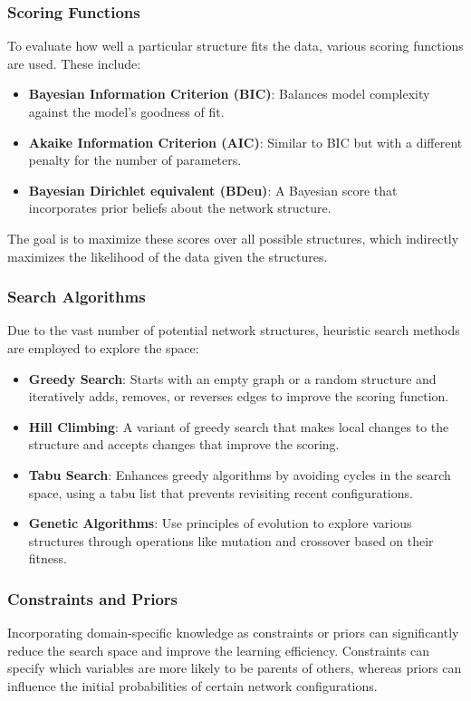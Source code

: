 \subsubsection{Scoring Functions}
To evaluate how well a particular structure fits the data, various scoring functions are used. These include:
\begin{itemize}
    \item \textbf{Bayesian Information Criterion (BIC)}: Balances model complexity against the model's goodness of fit.
    \item \textbf{Akaike Information Criterion (AIC)}: Similar to BIC but with a different penalty for the number of parameters.
    \item \textbf{Bayesian Dirichlet equivalent (BDeu)}: A Bayesian score that incorporates prior beliefs about the network structure.
\end{itemize}
The goal is to maximize these scores over all possible structures, which indirectly maximizes the likelihood of the data given the structures.

\subsubsection{Search Algorithms}
Due to the vast number of potential network structures, heuristic search methods are employed to explore the space:
\begin{itemize}
    \item \textbf{Greedy Search}: Starts with an empty graph or a random structure and iteratively adds, removes, or reverses edges to improve the scoring function.
    \item \textbf{Hill Climbing}: A variant of greedy search that makes local changes to the structure and accepts changes that improve the scoring.
    \item \textbf{Tabu Search}: Enhances greedy algorithms by avoiding cycles in the search space, using a tabu list that prevents revisiting recent configurations.
    \item \textbf{Genetic Algorithms}: Use principles of evolution to explore various structures through operations like mutation and crossover based on their fitness.
\end{itemize}

\subsubsection{Constraints and Priors}
Incorporating domain-specific knowledge as constraints or priors can significantly reduce the search space and improve the learning efficiency. Constraints can specify which variables are more likely to be parents of others, whereas priors can influence the initial probabilities of certain network configurations.

